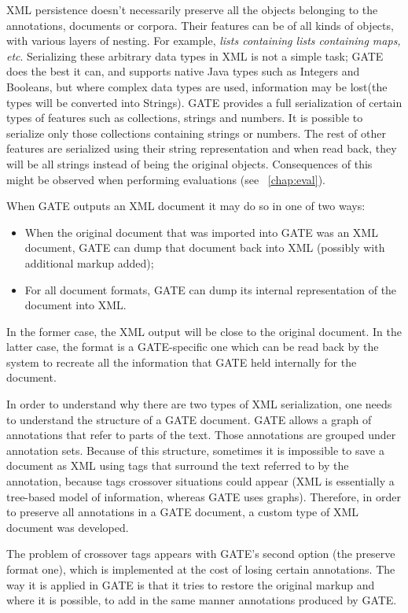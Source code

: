 XML persistence doesn't necessarily preserve all the objects belonging to the
annotations, documents or corpora. Their features can be of all kinds of objects,
with various layers of nesting. For example, {\em lists containing lists
containing maps, etc}. Serializing these arbitrary data types in XML is not a
simple task; GATE does the best it can, and supports native Java types such as
Integers and Booleans, but where complex data types are used, information may be
lost(the types will be converted into Strings). GATE provides a full
serialization of certain types of features such as collections, strings and
numbers. It is possible to serialize only those collections containing strings or
numbers. The rest of other features are serialized using their string
representation and when read back, they will be all strings instead of being the
original objects. Consequences of this might be observed when performing
evaluations (see \Chapthing~\ref{chap:eval}).

When GATE outputs an XML document it may do so in one of two ways:
%
\begin{itemize}
%
\item
When the original document that was imported into GATE was an XML
document, GATE can dump that document back into XML (possibly with
additional markup added);
%
\item
For all document formats, GATE can dump its internal
representation of the document into XML.
\end{itemize}
%
In the former case, the XML output will be close to the original document. In
the latter case, the format is a GATE-specific one which can be read back by
the system to recreate all the information that GATE held internally for the
document.

In order to understand why there are two types of XML
serialization, one needs to understand the structure of a GATE
document. GATE allows a graph of annotations that refer to parts
of the text. Those annotations are grouped under annotation sets.
Because of this structure, sometimes it is impossible to save a
document as XML using tags that surround the text referred to by the
annotation, because tags crossover situations could appear (XML is
essentially a tree-based model of information, whereas GATE uses
graphs). Therefore, in order to preserve all annotations in a GATE
document, a custom type of XML document was developed.

The problem of crossover tags appears with GATE's second option
(the preserve format one), which is implemented at the cost of
losing certain annotations. The way it is applied in GATE is that
it tries to restore the original markup and where it is possible,
to add in the same manner annotations produced by GATE.

